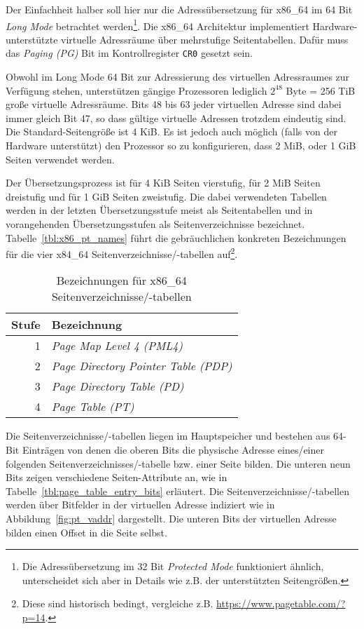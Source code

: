 Der Einfachheit halber soll hier nur die Adressübersetzung für x86\_64 im 64
Bit \textit{Long Mode} betrachtet werden\footnote{Die Adressübersetzung im 32
Bit \textit{Protected Mode} funktioniert ähnlich, unterscheidet sich aber in
Details wie z.B. der unterstützten Seitengrößen.}. Die x86\_64 Architektur
implementiert Hardware-unterstützte virtuelle Adressräume über mehrstufige
Seitentabellen. Dafür muss das \textit{Paging (PG)} Bit im Kontrollregister
\texttt{CR0} gesetzt sein.

Obwohl im Long Mode 64 Bit zur Adressierung des virtuellen Adressraumes zur
Verfügung stehen, unterstützen gängige Prozessoren lediglich $2^{48}$ Byte =
256 TiB große virtuelle Adressräume. Bits 48 bis 63 jeder virtuellen Adresse
sind dabei immer gleich Bit 47, so dass gültige virtuelle Adressen trotzdem
eindeutig sind.  Die Standard-Seitengröße ist 4 KiB. Es ist jedoch auch möglich
(falls von der Hardware unterstützt) den Prozessor so zu konfigurieren, dass 2
MiB, oder 1 GiB Seiten verwendet werden.

Der Übersetzungsprozess ist für 4 KiB Seiten vierstufig, für 2 MiB Seiten
dreistufig und für 1 GiB Seiten zweistufig. Die dabei verwendeten Tabellen
werden in der letzten Übersetzungsstufe meist als Seitentabellen und in
vorangehenden Übersetzungsstufen als Seitenverzeichnisse bezeichnet.
Tabelle~\ref{tbl:x86_pt_names} führt die gebräuchlichen konkreten Bezeichnungen
für die vier x84\_64 Seitenverzeichnisse/-tabellen auf\footnote{Diese sind
historisch bedingt, vergleiche z.B. \url{https://www.pagetable.com/?p=14}.}.

\begin{table}[H]
  \centering
  \caption{Bezeichnungen für x86\_64 Seitenverzeichnisse/-tabellen}
  \label{tbl:x86_pt_names}
  \vspace{10pt}
  \label{tbl:page_directory_table_names}
  \begin{tabular}{rl}
    \toprule
    Stufe & Bezeichnung \\
    \midrule
    1 & \textit{Page Map Level 4 (PML4)} \\
    2 & \textit{Page Directory Pointer Table (PDP)} \\
    3 & \textit{Page Directory Table (PD)} \\
    4 & \textit{Page Table (PT)} \\
    \bottomrule
  \end{tabular}
\end{table}

Die Seitenverzeichnisse/-tabellen liegen im Hauptspeicher und bestehen aus 64-Bit
Einträgen von denen die oberen Bits die physische Adresse eines/einer
folgenden Seitenverzeichnisses/-tabelle bzw. einer Seite bilden.  Die unteren
neun Bits zeigen verschiedene Seiten-Attribute an, wie in
Tabelle~\ref{tbl:page_table_entry_bits} erläutert.  Die
Seitenverzeichnisse/-tabellen werden über Bitfelder in der virtuellen Adresse
indiziert wie in Abbildung~\ref{fig:pt_vaddr} dargestellt. Die unteren Bits der
virtuellen Adresse bilden einen Offset in die Seite selbst.

